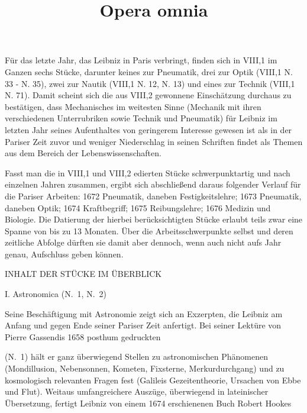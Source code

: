 Für das letzte Jahr, das Leibniz in Paris verbringt, finden sich in VIII,1 im Ganzen sechs Stücke, darunter keines zur Pneumatik, drei zur Optik (VIII,1 N. 33 - N. 35), zwei zur Nautik (VIII,1 N. 12, N. 13) und eines zur Technik (VIII,1 N. 71). Damit scheint sich die aus VIII,2 gewonnene Einschätzung durchaus zu bestätigen, dass Mechanisches im weitesten Sinne (Mechanik mit ihren verschiedenen Unterrubriken sowie Technik und Pneumatik) für Leibniz im letzten Jahr seines Aufenthaltes von geringerem Interesse gewesen ist als in der Pariser Zeit zuvor und weniger Niederschlag in seinen Schriften findet als Themen aus dem Bereich der Lebenswissenschaften.\par
Fasst man die in VIII,1 und VIII,2 edierten Stücke schwerpunktartig und nach einzelnen Jahren zusammen, ergibt sich abschließend daraus folgender Verlauf für die Pariser Arbeiten: 1672 Pneumatik, daneben Festigkeitslehre; 1673 Pneumatik, daneben Optik; 1674 Kraftbegriff; 1675 Reibungslehre; 1676 Medizin und Biologie. Die Datierung der hierbei berücksichtigten Stücke erlaubt teils zwar eine Spanne von bis zu 13 Monaten. Über die Arbeitsschwerpunkte selbst und deren zeitliche Abfolge dürften sie damit aber dennoch, wenn auch nicht aufs Jahr genau, Aufschluss geben können.\par
\par\vspace{6.0ex}
\noindent
\noindent\uppercase{Inhalt der Stücke im Überblick}
\par\vspace{3.0ex}
\noindent
I. Astronomica (N.~1, N.~2)\par\vspace{1.0ex}
\noindent
Seine Beschäftigung mit Astronomie zeigt sich an Exzerpten, die Leibniz am Anfang und gegen Ende seiner Pariser Zeit anfertigt. Bei seiner Lektüre von Pierre Gassendis\protect{}
 1658 posthum gedruckten \title{Opera omnia} (N.~1) hält er ganz überwiegend Stellen zu astronomischen Phänomenen (Mondillusion\protect{}, Nebensonnen\protect{}, Kometen\protect{}, Fixsterne\protect{}, Merkurdurchgang\protect{}) und zu kosmologisch relevanten Fragen fest (Galileis Gezeitentheorie\protect{}, Ursachen von Ebbe und Flut). Weitaus umfangreichere Auszüge, überwiegend in lateinischer Übersetzung, fertigt Leibniz von einem 1674 erschienenen Buch Robert Hookes\protect{}
